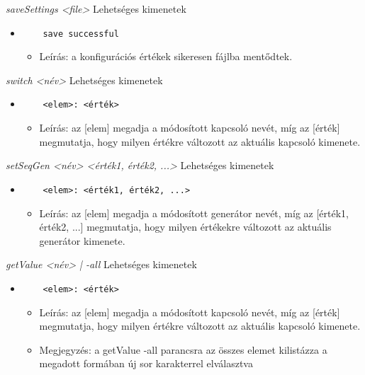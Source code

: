 \textit{saveSettings <file>}\newline
Lehetséges kimenetek
\begin{itemize}
	\item
	\begin{verbatim}
	save successful
	\end{verbatim}
	\begin{itemize}
		\item Leírás: a konfigurációs értékek sikeresen fájlba mentődtek.
	\end{itemize}
\end{itemize}

\textit{switch <név>}\newline
Lehetséges kimenetek
\begin{itemize}
	\item
	\begin{verbatim}
	<elem>: <érték>
	\end{verbatim}
	\begin{itemize}
		\item Leírás: az [elem] megadja a módosított kapcsoló nevét, míg az [érték] megmutatja, hogy milyen értékre változott az aktuális kapcsoló kimenete. 
	\end{itemize}
\end{itemize}

\textit{setSeqGen <név> <érték1, érték2, ...>}\newline
Lehetséges kimenetek
\begin{itemize}
	\item 
	\begin{verbatim}
	<elem>: <érték1, érték2, ...>
	\end{verbatim}
	\begin{itemize}
		\item Leírás: az [elem] megadja a módosított generátor nevét, míg az [érték1, érték2, ...] megmutatja, hogy milyen értékekre változott az aktuális generátor kimenete. 
	\end{itemize}
\end{itemize}

\textit{getValue <név> | -all}\newline
Lehetséges kimenetek
\begin{itemize}
	\item
	\begin{verbatim}
	<elem>: <érték>
	\end{verbatim}
	\begin{itemize}
		\item Leírás: az [elem] megadja a módosított kapcsoló nevét, míg az [érték] megmutatja, hogy milyen értékre változott az aktuális kapcsoló kimenete.
		\item Megjegyzés: a getValue -all parancsra az összes elemet kilistázza a megadott formában új sor karakterrel elválasztva
	\end{itemize}
\end{itemize}

